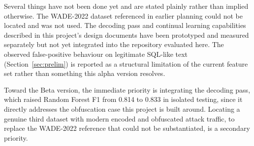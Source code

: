 \documentclass[runningheads]{llncs}
\begin{document}
Several things have not been done yet and are stated plainly rather
than implied otherwise. The WADE-2022 dataset referenced in earlier
planning could not be located and was not used. The decoding pass and
continual learning capabilities described in this project's design
documents have been prototyped and measured separately but not yet
integrated into the repository evaluated here. The observed
false-positive behaviour on legitimate SQL-like text
(Section~\ref{sec:prelim}) is reported as a structural limitation of
the current feature set rather than something this alpha version
resolves.

Toward the Beta version, the immediate priority is integrating the
decoding pass, which raised Random Forest F1 from 0.814 to 0.833 in
isolated testing, since it directly addresses the obfuscation case
this project is built around. Locating a genuine third dataset with
modern encoded and obfuscated attack traffic, to replace the WADE-2022
reference that could not be substantiated, is a secondary priority.



\end{document}
